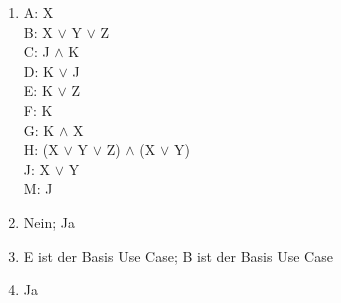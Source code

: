 \documentclass[a4paper, 12pt, margins=2.5cm]{homework}
\begin{document}
  
  \begin{problem}
    
  \end{problem}
  \begin{solution}\hfill
    
    \begin{enumerate}[label=\alph*)]\itemsep0pt
      \item \hfill

        A: X \\
        B: X $\vee$ Y $\vee$ Z \\
        C: J $\wedge$ K \\
        D: K $\vee$ J \\
        E: K $\vee$ Z \\
        F: K \\
        G: K $\wedge$ X \\
        H: (X $\vee$ Y $\vee$ Z) $\wedge$ (X $\vee$ Y) \\
        J: X $\vee$ Y \\
        M: J \\

      \item Nein; Ja
      \item E ist der Basis Use Case; B ist der Basis Use Case
      \item Ja

    \end{enumerate}
  \end{solution}
  
\end{document}
